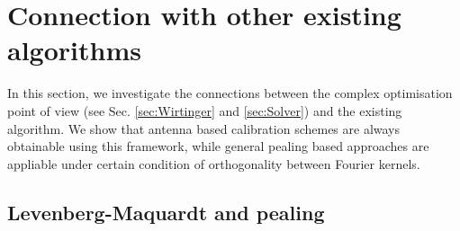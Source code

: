 \section{Connection with other existing algorithms}
\label{sec:Connection}

In this section, we investigate the connections between the complex
optimisation point of view (see Sec. \ref{sec:Wirtinger} and
\ref{sec:Solver}) and the existing algorithm. We show that antenna
based calibration schemes are always obtainable using this framework,
while general pealing based approaches are appliable under certain condition
of orthogonality between Fourier kernels.


\subsection{Levenberg-Maquardt and pealing}

\subsection{}


